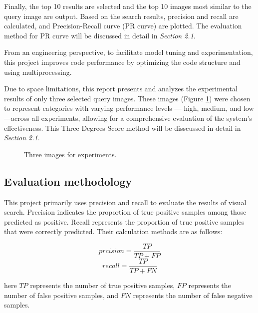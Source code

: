 \documentclass{article}
\begin{document}
Finally, the top 10 results are selected and the top 10 images most similar to the query image are output. Based on the search results, precision and recall are calculated, and Precision-Recall curve (PR curve) are plotted. The evaluation method for PR curve will be discussed in detail in \textit{Section 2.1}.

From an engineering perspective, to facilitate model tuning and experimentation, this project improves code performance by optimizing the code structure and using multiprocessing.

Due to space limitations, this report presents and analyzes the experimental results of only three selected query images. These images (Figure \ref{fig:images}) were chosen to represent categories with varying performance levels — high, medium, and low—across all experiments, allowing for a comprehensive evaluation of the system’s effectiveness. This Three Degrees Score method will be disscussed in detail in \textit{Section 2.1}.

\begin{figure}[!tbp]
  \centering
  \subfloat[1-2-s]{\texttt{[image: 1-2-s]}\label{fig:1-2-s}}
  \hfill
  \subfloat[10-17-s]{\texttt{[image: 10-17-s]}\label{fig:10-17-s}}
  \hfill
  \subfloat[17-10-s]{\texttt{[image: 17-10-s]}\label{fig:17-10-s}}
  \caption{\label{fig:images} Three images for experiments.}
\end{figure}


\subsection{Evaluation methodology}

This project primarily uses precision and recall to evaluate the results of visual search. Precision indicates the proportion of true positive samples among those predicted as positive. Recall represents the proportion of true positive samples that were correctly predicted. Their calculation methods are as follows:

\begin{equation}
  \label{eqn:pr}
  prcision = \frac{TP}{TP + FP}
  \end{equation}
\begin{equation}
  \label{eqn:pr}
  recall = \frac{TP}{TP + FN}
  \end{equation}

  here $TP$ represents the number of true positive samples, $FP$ represents the number of false positive samples, and $FN$ represents the number of false negative samples.
\end{document}
